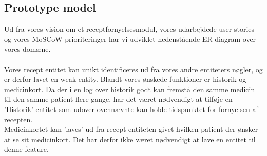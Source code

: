 \subsection{Prototype model}
Ud fra vores vision om et receptfornyelsesmodul, vores udarbejdede user stories og vores MoSCoW prioriteringer har vi udviklet nedenstående ER-diagram over vores domæne.\\
\\
Vores recept entitet kan unikt identificeres ud fra vores andre entiteters nøgler, og er derfor lavet en weak entity. Blandt vores ønskede funktioner er historik og medicinkort. Da der i en log over historik godt kan fremstå den samme medicin til den samme patient flere gange, har det været nødvendigt at tilføje en 'Historik' entitet som udover ovennævnte kan holde tidspunktet for fornyelsen af recepten.\\
Medicinkortet kan 'laves' ud fra recept entiteten givet hvilken patient der ønsker at se sit medicinkort. Det har derfor ikke været nødvendigt at lave en entitet til denne feature.\\


